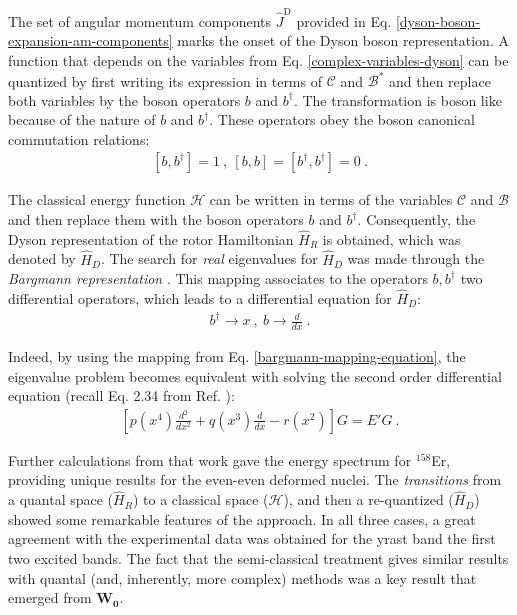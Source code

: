 The set of angular momentum components $\hat{J}^\text{D}$ provided in Eq. \ref{dyson-boson-expansion-am-components} marks the onset of the Dyson boson representation. A function that depends on the variables from Eq. \ref{complex-variables-dyson} can be quantized by first writing its expression in terms of $\mathcal{C}$ and $\mathcal{B}^*$ and then replace both variables by the boson operators $b$ and $b^\dagger$. The transformation is boson like because of the nature of $b$ and $b^\dagger$. These operators obey the boson canonical commutation relations:
\begin{align}
    \left[b,b^\dagger\right]=1\ ,\ \left[b,b\right]=\left[b^\dagger,b^\dagger\right]=0\ .
    \label{boson-commutation-relations}
\end{align}

The classical energy function $\mathcal{H}$ can be written in terms of the variables $\mathcal{C}$ and $\mathcal{B}$ and then replace them with the boson operators $b$ and $b^\dagger$. Consequently, the Dyson representation of the rotor Hamiltonian $\hat{H}_R$ is obtained, which was denoted by $\hat{H}_D$. The search for \emph{real} eigenvalues for $\hat{H}_D$ was made through the \emph{Bargmann representation} \cite{bargmann1962representations,jancovici1964collective,janssen1971boson}. This mapping associates to the operators $b,b^\dagger$ two differential operators, which leads to a differential equation for $\hat{H}_D$:
\begin{align}
    b^\dagger\rightarrow x\ ,\ b\rightarrow \frac{d}{dx}\ .
    \label{bargmann-mapping-equation}
\end{align}

Indeed, by using the mapping from Eq. \ref{bargmann-mapping-equation}, the eigenvalue problem becomes equivalent with solving the second order differential equation (recall Eq. 2.34 from Ref. \cite{raduta2017semiclassical}):
\begin{align}
    \left[p(x^4)\frac{d^2}{dx^2}+q(x^3)\frac{d}{dx}-r(x^2)\right]G=E'G\ .
\end{align}

Further calculations from that work gave the energy spectrum for $^{158}$Er, providing unique results for the even-even deformed nuclei. The \emph{transitions} from a quantal space ($\hat{H}_R$) to a classical space ($\mathcal{H}$), and then a re-quantized ($\hat{H}_D$) showed some remarkable features of the approach. In all three cases, a great agreement with the experimental data was obtained for the yrast band the first two excited bands. The fact that the semi-classical treatment gives similar results with quantal (and, inherently, more complex) methods was a key result that emerged from $\mathbf{W_0}$.

